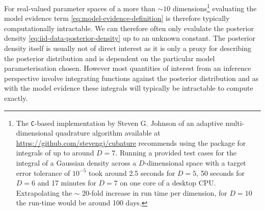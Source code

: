 For real-valued parameter spaces of a more than $\sim 10$ dimensions\footnote{The \texttt{C}-based implementation by Steven G. Johnson of an adaptive multi-dimensional quadrature algorithm \citep{berntsen1991adaptive} available at \url{https://github.com/stevengj/cubature} recommends using the package for integrals of up to around $D = 7$. Running a provided test cases for the integral of a Gaussian density across a $D$-dimensional space with a target error tolerance of $10^{-5}$ took around 2.5 seconds for $D=5$, 50 seconds for $D=6$ and 17 minutes for $D=7$ on one core of a desktop \acs{CPU}. Extrapolating the $\sim$ 20-fold increase in run time per dimension, for $D=10$ the run-time would be around 100 days.} 
evaluating the model evidence term \eqref{eq:model-evidence-definition} is therefore typically computationally intractable. We can therefore often only evalulate the posterior density \eqref{eq:iid-data-posterior-density} up to an unknown constant. The posterior density itself is usually not of direct interest as it is only a proxy for describing the posterior distribution and is dependent on the particular model parameterisation chosen. However most quantities of interest from an inference perspective involve integrating functions against the posterior distribution and as with the model evidence these integrals will typically be intractable to compute exactly. 

